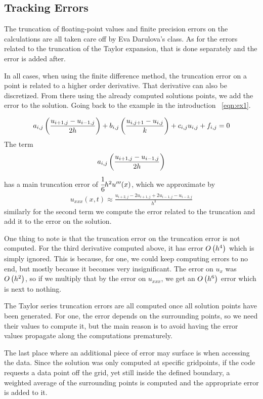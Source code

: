 \subsection{Tracking Errors}
The truncation of floating-point values and finite precision errors on the calculations are all
taken care off by Eva Darulova's 
class\cite{darulova}. As for the errors related to the truncation of
the Taylor expansion, that is done separately and the error is added
after.

In all cases, when using the finite difference method, the truncation
error on a point is related to a higher order derivative. That
derivative can also be discretized. From there using the already
computed solutions points, we add the error to the solution. Going
back to the example in the introduction ~\ref{eqn:ex1}.

\begin{align*}
    a_{i, j}\left(\frac{u_{i+1, j} - u_{i-1, j}}{2h}\right) +  b_{i,
        j}\left(\frac{u_{i, j+1} - u_{i, j}}{k}\right) + c_{i, j}u_{i, j}
    + f_{i, j} = 0
\end{align*}
The term
\begin{align*}
    a_{i, j}\left(\frac{u_{i+1, j} - u_{i-1, j}}{2h}\right)
\end{align*}
has a main truncation error of $\cfrac{1}{6}h^2u'''(x)$, which we
approximate by
\begin{align*}
    u_{xxx}(x, t)\approx\frac{u_{i+2, j} - 2u_{i+1, j}+2u_{i-1, j}- u_{i-2, j}}{h^3}
\end{align*}
similarly for the second term we compute the error related to the
truncation and add it to the error on the solution.

One thing to note is that the truncation error on the truncation error
is not computed. For the third derivative computed above, it has error
$O\left(h^4\right)$ which is simply ignored. This is because, for one, we
could keep computing errors to no end, but mostly because it becomes
very insignificant. The error on $u_x$ was $O\left(h^2\right)$, so if we
multiply that by the error on $u_{xxx}$, we get an $O\left(h^6\right)$
error which is next to nothing.

The Taylor series truncation errors are all computed once all solution
points have been generated. For one, the error depends on the
surrounding points, so we need their values to compute it, but the
main reason is to avoid having the error values propagate along the
computations prematurely.

The last place where an additional piece of error may surface is when
accessing the data. Since the solution was only computed at specific
gridpoints, if the code requests a data point off the grid, yet still
inside the defined boundary, a weighted average of the surrounding
points is computed and the appropriate error is added to it.

